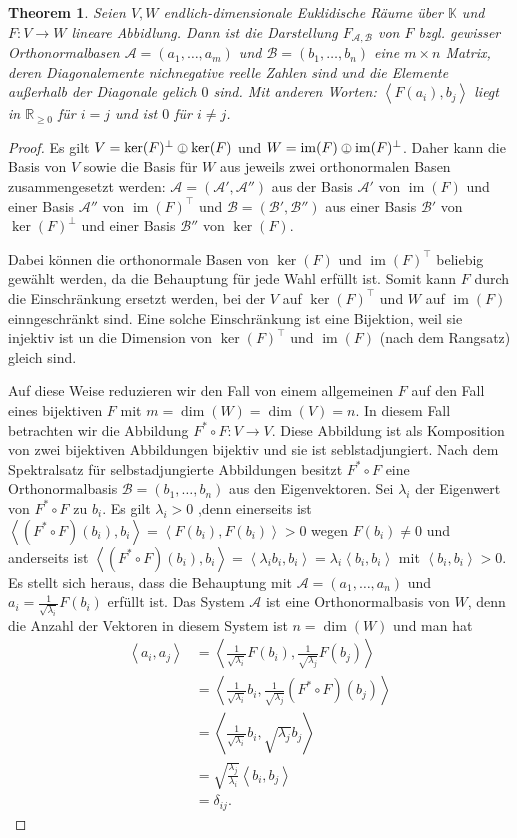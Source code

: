 \documentclass[
a4paper,landscape,16pt,
bibliography=totocnumbered,
numbers=noenddot,
]{scrartcl}
\numberwithin{equation}{subsection}
\newcommand{\R}{\mathbb R}
\newcommand{\K}{\mathbb K}
\newcommand{\im}{\operatorname{im}} %
\newcommand{\cA}{\mathcal{A}}
\newcommand{\cB}{\mathcal{B}}
\newcommand{\scalar}[1]{\left\langle #1 \right\rangle}
\newcommand{\obot}{\mathrel{\tikz[baseline=-\the\dimexpr\fontdimen22\textfont2\relax]{ \node[circle,draw,inner sep=0pt,scale=0.625,line width=0.3pt]{$ \bot $}; }}} %
\theoremstyle{plain}
\newtheorem*{thm}{Theorem}
\theoremstyle{definition}
\begin{document}
\begin{thm}
	Seien $V, W$ endlich-dimensionale Euklidische Räume über $\K$ und  $F : V \to W$ lineare Abbidlung. Dann ist die Darstellung $F_{\cA,\cB}$ von $F$ bzgl. gewisser Orthonormalbasen $\cA = (a_1,\ldots,a_m)$ und $\cB= (b_1,\ldots,b_n)$ eine $m \times n$ Matrix, deren Diagonalemente nichnegative reelle Zahlen sind und die Elemente außerhalb der Diagonale gelich $0$ sind. Mit anderen Worten: $\scalar{F(a_i),b_j}$ liegt in $\R_{\ge 0}$ für $i  = j$ und ist $0$ für $i \ne j$. 
\end{thm}
\begin{proof}
	Es gilt $V =  \ker(F)^\bot \obot \ker(F)$  und $W = \im(F) \obot \im(F)^\bot$. Daher kann die Basis von $V$ sowie die Basis für $W$ aus jeweils zwei orthonormalen Basen zusammengesetzt werden: $\cA = (\cA',\cA'')$ aus der Basis $\cA'$ von $\im(F)$ und einer Basis $\cA''$ von $\im(F)^\top$ und $\cB=(\cB', \cB'')$ aus einer Basis $\cB'$ von $\ker(F)^\bot$ und einer Basis $\cB''$ von $\ker(F)$. 
	
	 Dabei können die orthonormale Basen von $\ker(F)$ und $\im(F)^\top$ beliebig gewählt werden, da die Behauptung für jede Wahl erfüllt ist. Somit kann $F$ durch die Einschränkung ersetzt werden, bei der $V$ auf $\ker(F)^\top$ und $W$ auf $\im(F)$ einngeschränkt sind. Eine solche Einschränkung ist eine Bijektion, weil sie injektiv ist un die Dimension von $\ker(F)^\top$ und $\im(F)$ (nach dem Rangsatz) gleich sind. 
	 
	 Auf diese Weise reduzieren wir den Fall von einem allgemeinen $F$ auf den Fall eines bijektiven $F$ mit $m = \dim(W) = \dim(V) =n$. In diesem Fall betrachten wir die Abbildung $F^\ast \circ F : V \to V$. Diese Abbildung ist als Komposition von zwei bijektiven Abbildungen bijektiv und sie ist seblstadjungiert. Nach dem Spektralsatz für selbstadjungierte Abbildungen besitzt $F^\ast \circ F$ eine Orthonormalbasis $\cB = (b_1,\ldots,b_n)$  aus den Eigenvektoren. Sei $\lambda_i$ der Eigenwert von $F^\ast \circ F$ zu $b_i$. Es gilt $\lambda_i> 0$ ,denn einerseits ist $\scalar{ (F^\ast \circ F)(b_i), b_i } = \scalar{ F(b_i), F(b_i)} > 0$ wegen $F(b_i) \ne 0$ und anderseits ist $\scalar{ (F^\ast \circ F)(b_i), b_i } = \scalar{\lambda_i b_i , b_i} = \lambda_i \scalar{ b_i , b_i}$ mit $\scalar{b_i,b_i}> 0$. Es stellt  sich heraus, dass die Behauptung mit $\cA = (a_1,\ldots,a_n)$ und $a_i = \frac{1}{\sqrt{\lambda_i}} F(b_i)$ erfüllt ist. Das System $\cA$ ist eine Orthonormalbasis von $W$, denn die Anzahl der Vektoren in diesem System ist $n=\dim(W)$ und man hat 
	 \begin{align*}
	 	\scalar{ a_i , a_j} & = \scalar{ \frac{1}{\sqrt{\lambda_i}} F(b_i) , \frac{1}{\sqrt{\lambda_j}} F(b_j)} \\ & = \scalar{ \frac{1}{\sqrt{\lambda_i}} b_i , \frac{1}{\sqrt{\lambda_j}} (F^\ast \circ  F)(b_j)}  
	 	\\ & = \scalar{ \frac{1}{\sqrt{\lambda_i}} b_i , \sqrt{\lambda_j}b_j}  
	 	\\ &  = \sqrt{ \frac{\lambda_j}{\lambda_i} } \scalar{b_i , b_j} 
	 	\\ & = \delta_{ij}. 
	 \end{align*}
 

\end{proof}
\end{document}
